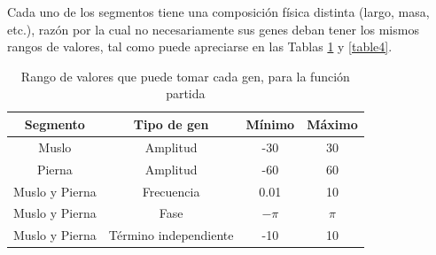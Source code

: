\documentclass{article}
\begin{document}
Cada uno de los segmentos tiene una composici\'on f\'isica distinta (largo, masa, etc.), raz\'on por la cual no necesariamente sus genes deban tener los mismos rangos de valores, tal como puede apreciarse en las Tablas \ref{table3} y \ref{table4}. \\
\begin{table}[H]%
  \centering
  	\begin{tabular}{ | c | c || c | c | }
	  		\hline
	  		\textbf{Segmento} & \textbf{Tipo de gen} & \textbf{M\'inimo} & \textbf{M\'aximo} \\
			\hline
			Muslo & Amplitud & -30 & 30\\
			\hline
			Pierna & Amplitud & -60 & 60\\ 
			\hline
	  		Muslo y Pierna & Frecuencia & 0.01 & 10 \\ 
	  		\hline
			Muslo y Pierna & Fase & $-\pi$ & $\pi$ \\ 
			\hline
			Muslo y Pierna & T\'ermino independiente & -10 & 10 \\ 
			\hline
	\end{tabular}
  \captionsetup{justification=centering}
  \caption{Rango de valores que puede tomar cada gen, para la funci\'on partida}%
  \label{table3}%
\end{table}
\vspace{1pt}
\end{document}
